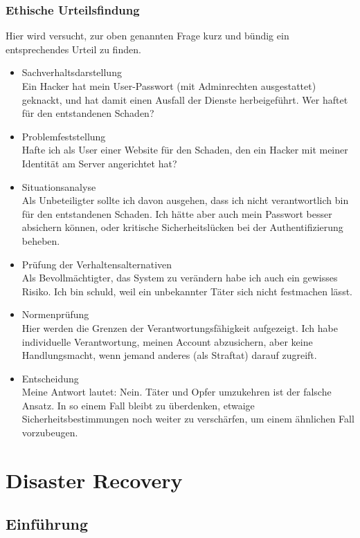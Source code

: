 \documentclass[letterpaper, 12pt]{article}
\let\tempsection\section
\renewcommand\section[1]{\vspace{-0.3cm}\tempsection{#1}\vspace{-0.3cm}}
\let\tempsubsection\subsection
\renewcommand\subsection[1]{\vspace{0cm}\tempsubsection{#1}\vspace{0cm}}
\let\tempsubsubsection\subsubsection
\renewcommand\subsubsection[1]{\vspace{0cm}\tempsubsubsection{#1}\vspace{0cm}}
\begin{document}
\subsubsection{Ethische Urteilsfindung}

Hier wird versucht, zur oben genannten Frage kurz und bündig ein entsprechendes Urteil zu finden.

\begin{itemize}
	\item Sachverhaltsdarstellung \\
	Ein Hacker hat mein User-Passwort (mit Adminrechten ausgestattet) geknackt, und hat damit einen Ausfall der Dienste herbeigeführt. Wer haftet für den entstandenen Schaden? 
	\item Problemfeststellung \\
	Hafte ich als User einer Website für den Schaden, den ein Hacker mit meiner Identität am Server angerichtet hat?
	\item Situationsanalyse \\
	Als Unbeteiligter sollte ich davon ausgehen, dass ich nicht verantwortlich bin für den entstandenen Schaden. Ich hätte aber auch mein Passwort besser absichern können, oder kritische Sicherheitslücken bei der Authentifizierung beheben.
	\item Prüfung der Verhaltensalternativen \\
	Als Bevollmächtigter, das System zu verändern habe ich auch ein gewisses Risiko. Ich bin schuld, weil ein unbekannter Täter sich nicht festmachen lässt.
	\item Normenprüfung \\
	Hier werden die Grenzen der Verantwortungsfähigkeit aufgezeigt. Ich habe individuelle Verantwortung, meinen Account abzusichern, aber keine Handlungsmacht, wenn jemand anderes (als Straftat) darauf zugreift.
	\item Entscheidung \\
	Meine Antwort lautet: Nein. Täter und Opfer umzukehren ist der falsche Ansatz. In so einem Fall bleibt zu überdenken, etwaige Sicherheitsbestimmungen noch weiter zu verschärfen, um einem ähnlichen Fall vorzubeugen.
\end{itemize}

\clearpage

\section{Disaster Recovery}

\subsection{Einführung}
\end{document}

